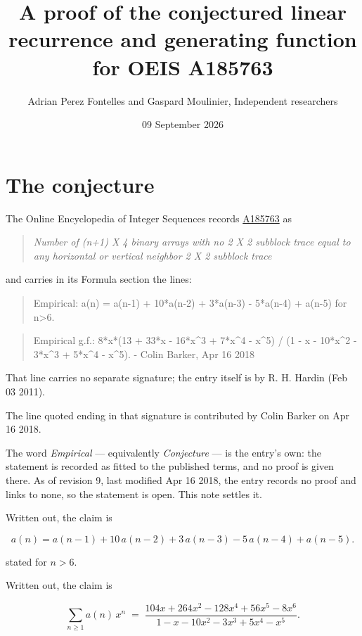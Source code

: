 \documentclass[11pt]{article}
\title{A proof of the conjectured linear recurrence and generating function for OEIS A185763}
\author{Adrian Perez Fontelles and Gaspard Moulinier, Independent researchers}
\date{09 September 2026}
\theoremstyle{definition}
\begin{document}
\maketitle
\section{The conjecture}

The Online Encyclopedia of Integer Sequences records \href{https://oeis.org/A185763}{A185763} as

\begin{quote}\itshape Number of (n+1) X 4 binary arrays with no 2 X 2 subblock trace equal to any horizontal or vertical neighbor 2 X 2 subblock trace\end{quote}

and carries in its Formula section the lines:

\begin{quote}\ttfamily Empirical: a(n) = a(n-1) + 10*a(n-2) + 3*a(n-3) - 5*a(n-4) + a(n-5) for n>6.\end{quote}

\begin{quote}\ttfamily Empirical g.f.: 8*x*(13 + 33*x - 16*x\textasciicircum{}3 + 7*x\textasciicircum{}4 - x\textasciicircum{}5) / (1 - x - 10*x\textasciicircum{}2 - 3*x\textasciicircum{}3 + 5*x\textasciicircum{}4 - x\textasciicircum{}5). - Colin Barker, Apr 16 2018\end{quote}

That line carries no separate signature; the entry itself is by R. H. Hardin (Feb 03 2011).

The line quoted ending in that signature is contributed by Colin Barker on Apr 16 2018.

The word {\itshape Empirical} --- equivalently {\itshape Conjecture} --- is the entry's own: the statement is recorded as fitted to the published terms, and no proof is given there. As of revision 9, last modified Apr 16 2018, the entry records no proof and links to none, so the statement is open. This note settles it.

Written out, the claim is

\[a(n) = a(n-1) + 10\,a(n-2) + 3\,a(n-3) - 5\,a(n-4) + a(n-5).\]

stated for $n > 6$.

Written out, the claim is

\[\sum_{n \ge 1} a(n)\,x^n \;=\; \frac{104x + 264x^{2} - 128x^{4} + 56x^{5} - 8x^{6}}{1 - x - 10x^{2} - 3x^{3} + 5x^{4} - x^{5}}.\]
\end{document}
